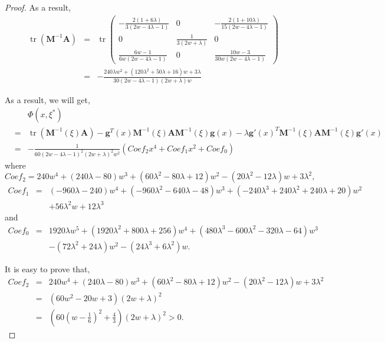 \documentclass[preprint,12pt]{elsarticle}
\DeclareMathOperator{\tr}{tr} \DeclareMathOperator{\err}{err}
\begin{document}
\begin{proof}
As a result,
\begin{eqnarray*}
\tr\left(\boldsymbol{M}^{-1}\boldsymbol{A}\right)&=&\tr\left(\begin{array}{ccc}-\frac{2(1+6\lambda)}{3(2w-4\lambda-1)}&0&-\frac{2(1+10\lambda)}{15(2w-4\lambda-1)}\\0&\frac{1}{3(2w+\lambda)}&0\\
\frac{6w-1}{6w(2w-4\lambda-1)}&0&\frac{10w-3}{30w(2w-4\lambda-1)}\end{array}\right)\\
&=&-\frac{240\lambda
w^2+(120\lambda^2+50\lambda+16)w+3\lambda}{30(2w-4\lambda-1)(2w+\lambda)w}
\end{eqnarray*}

As a result, we will get,
\begin{eqnarray*}
&&\Phi(x,\xi^*)\\
&=&\tr\left(\boldsymbol{M}^{-1}(\xi)\boldsymbol{A}\right)-\boldsymbol{g}^T(x)\boldsymbol{M}^{-1}(\xi)\boldsymbol{A}\boldsymbol{M}^{-1}(\xi)\boldsymbol{g}(x)-\lambda\boldsymbol{g}'(x)^T\boldsymbol{M}^{-1}(\xi)\boldsymbol{A}\boldsymbol{M}^{-1}(\xi)\boldsymbol{g}'(x)\\
&=&
-\frac{1}{60(2w-4\lambda-1)^2(2w+\lambda)^2w^2}\left(Coef_2x^4+Coef_1x^2+Coef_0\right)
\end{eqnarray*}
where
$$Coef_2=240w^4+(240\lambda-80)w^3+\left(60\lambda^2-80\lambda+12\right)w^2-\left(20\lambda^2-12\lambda\right)w+3\lambda^2,$$
\begin{eqnarray*}
Coef_1&=&(-960\lambda-240)w^4+\left(-960\lambda^2-640\lambda-48\right)w^3+\left(-240\lambda^3+240\lambda^2+240\lambda+20\right)w^2\\
&&+56\lambda^2w+12\lambda^3
\end{eqnarray*}
and
\begin{eqnarray*}
Coef_0&=&1920\lambda
w^5+\left(1920\lambda^2+800\lambda+256\right)w^4+\left(480\lambda^3-600\lambda^2-320\lambda-64\right)w^3\\
&&-\left(72\lambda^2+24\lambda\right)w^2-\left(24\lambda^3+6\lambda^2\right)w.
\end{eqnarray*}

It is easy to prove that,
\begin{eqnarray*}
Coef_2&=&240w^4+(240\lambda-80)w^3+\left(60\lambda^2-80\lambda+12\right)w^2-\left(20\lambda^2-12\lambda\right)w+3\lambda^2\\
&=& \left(60w^2-20w+3\right)(2w+\lambda)^2\\
&=&
\left(60\left(w-\frac{1}{6}\right)^2+\frac{4}{3}\right)(2w+\lambda)^2>0.
\end{eqnarray*}


\end{proof}
\end{document}
